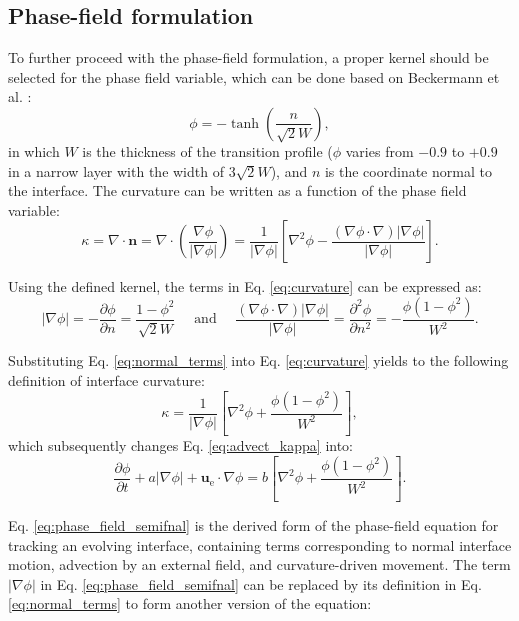 \subsection{Phase-field formulation}

To further proceed with the phase-field formulation, a proper kernel should be selected for the phase field variable, which can be done based on Beckermann et al. \cite{Beckermann1999}:
\begin{equation} \label{eq:kernel}
\phi=-\tanh \left(\frac{n}{\sqrt{2} W}\right),
\end{equation}
in which $W$ is the thickness of the transition profile ($\phi$ varies from $-0.9$ to $+0.9$ in a narrow layer with the width of $3 \sqrt{2} W$), and $n$ is the coordinate normal to the interface. The curvature can be written as a function of the phase field variable:
\begin{equation}  \label{eq:curvature}
\kappa=\nabla \cdot \boldsymbol{n}=\nabla \cdot\left(\frac{\nabla \phi}{|\nabla \phi|}\right)=\frac{1}{|\nabla \phi|}\left[\nabla^{2} \phi-\frac{(\nabla \phi \cdot \nabla)|\nabla \phi|}{|\nabla \phi|}\right].
\end{equation}

Using the defined kernel, the terms in Eq. \ref{eq:curvature} can be expressed as:
\begin{equation} \label{eq:normal_terms}
|\nabla \phi|=-\frac{\partial \phi}{\partial n}=\frac{1-\phi^{2}}{\sqrt{2} W} \quad \text { and } \quad \frac{(\nabla \phi \cdot \nabla)|\nabla \phi|}{|\nabla \phi|}=\frac{\partial^{2} \phi}{\partial n^{2}}=-\frac{\phi\left(1-\phi^{2}\right)}{W^{2}}.
\end{equation}

Substituting Eq. \ref{eq:normal_terms} into Eq. \ref{eq:curvature} yields to the following definition of interface curvature: 
\begin{equation}
\kappa=\frac{1}{|\nabla \phi|}\left[\nabla^{2} \phi+\frac{\phi\left(1-\phi^{2}\right)}{W^{2}}\right],
\end{equation}
which subsequently changes Eq. \ref{eq:advect_kappa} into:
\begin{equation} \label{eq:phase_field_semifnal}
\frac{\partial \phi}{\partial t}+a|\nabla \phi|+\boldsymbol{u}_{\mathrm{e}} \cdot \nabla \phi=b\left[\nabla^{2} \phi+\frac{\phi\left(1-\phi^{2}\right)}{W^{2}}\right].
\end{equation}

Eq. \ref{eq:phase_field_semifnal} is the derived form of the phase-field equation for tracking an evolving interface, containing terms corresponding to normal interface motion, advection by an external field, and curvature-driven movement. The term $|\nabla \phi|$ in Eq. \ref{eq:phase_field_semifnal} can be replaced by its definition in Eq. \ref{eq:normal_terms} to form another version of the equation:

